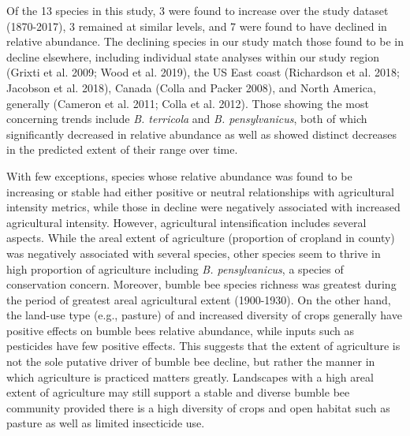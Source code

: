 \documentclass[11pt,]{article}
\begin{document}
Of the 13 species in this study, 3 were found to increase over the study
dataset (1870-2017), 3 remained at similar levels, and 7 were found to
have declined in relative abundance. The declining species in our study
match those found to be in decline elsewhere, including individual state
analyses within our study region (Grixti et al. 2009; Wood et al. 2019),
the US East coast (Richardson et al. 2018; Jacobson et al. 2018), Canada
(Colla and Packer 2008), and North America, generally (Cameron et al.
2011; Colla et al. 2012). Those showing the most concerning trends
include \emph{B. terricola} and \emph{B. pensylvanicus}, both of which
significantly decreased in relative abundance as well as showed distinct
decreases in the predicted extent of their range over time.

With few exceptions, species whose relative abundance was found to be
increasing or stable had either positive or neutral relationships with
agricultural intensity metrics, while those in decline were negatively
associated with increased agricultural intensity. However, agricultural
intensification includes several aspects. While the areal extent of
agriculture (proportion of cropland in county) was negatively associated
with several species, other species seem to thrive in high proportion of
agriculture including \emph{B. pensylvanicus}, a species of conservation
concern. Moreover, bumble bee species richness was greatest during the
period of greatest areal agricultural extent (1900-1930). On the other
hand, the land-use type (e.g., pasture) of and increased diversity of
crops generally have positive effects on bumble bees relative abundance,
while inputs such as pesticides have few positive effects. This suggests
that the extent of agriculture is not the sole putative driver of bumble
bee decline, but rather the manner in which agriculture is practiced
matters greatly. Landscapes with a high areal extent of agriculture may
still support a stable and diverse bumble bee community provided there
is a high diversity of crops and open habitat such as pasture as well as
limited insecticide use.
\end{document}
